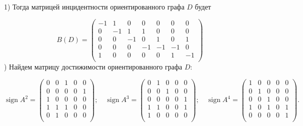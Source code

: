 \documentclass[fleqn]{article}
\DeclareMathOperator{\sign}{sign}
\begin{document}
1) Тогда матрицей инцидентности ориентированного графа $D$ будет

$$B(D)=
\begin{pmatrix}
-1 & 1 & 0 & 0 & 0 & 0 & 0 \\
0 & -1 & 1 & 1 & 0 & 0 & 0 \\
0 & 0 & -1 & 0 & 1 & 0 & 1 \\
0 & 0 & 0 & -1 & -1 & -1 & 0 \\
1 & 0 & 0 & 0 & 0 & 1 & -1 \\
\end{pmatrix}
$$
) Найдем матрицу достижимости ориентированного графа $D$:

$$
\sign{A^2} = \begin{pmatrix}
0 & 0 & 1 & 0 & 0 \\
0 & 0 & 0 & 0 & 1 \\
1 & 0 & 0 & 0 & 0 \\
1 & 1 & 1 & 0 & 0 \\
0 & 1 & 0 & 0 & 0 \\
\end{pmatrix}
;\quad
\sign{A^3} = \begin{pmatrix}
0 & 1 & 0 & 0 & 0 \\
0 & 0 & 1 & 0 & 0 \\
0 & 0 & 0 & 0 & 1 \\
1 & 1 & 0 & 0 & 1 \\
1 & 0 & 0 & 0 & 0 \\
\end{pmatrix}
;\quad
\sign{A^4} = \begin{pmatrix}
1 & 0 & 0 & 0 & 0 \\
0 & 1 & 0 & 0 & 0 \\
0 & 0 & 1 & 0 & 0 \\
1 & 0 & 1 & 0 & 1 \\
0 & 0 & 0 & 0 & 1 \\
\end{pmatrix}.
$$
\end{document}
